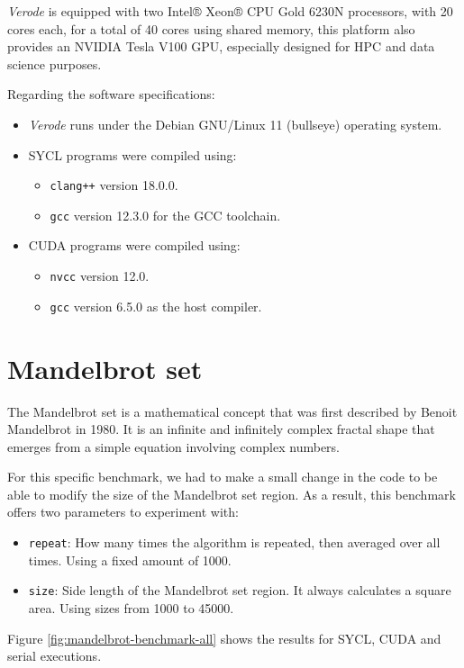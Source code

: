 \textit{Verode} is equipped with two Intel® Xeon® CPU Gold 6230N processors,  with 20 cores each, for a total of 40 cores using shared memory, this platform also provides an NVIDIA Tesla V100 GPU, especially designed for HPC and data science purposes.

Regarding the software specifications:
\begin{itemize}
    \item \textit{Verode} runs under the Debian GNU/Linux 11 (bullseye) operating system.
    \item SYCL programs were compiled using:
    \begin{itemize}
        \item \texttt{clang++} version 18.0.0.
        \item \texttt{gcc} version 12.3.0 for the GCC toolchain.
    \end{itemize}
    \item CUDA programs were compiled using:
        \begin{itemize}
            \item \texttt{nvcc} version 12.0.
            \item \texttt{gcc} version 6.5.0 as the host compiler.
        \end{itemize}
\end{itemize}

\section{Mandelbrot set}
The Mandelbrot set is a mathematical concept that was first described by Benoit Mandelbrot in 1980.
It is an infinite and infinitely complex fractal shape that emerges from a simple equation involving complex numbers.

For this specific benchmark, we had to make a small change in the code to be able to modify the size of the Mandelbrot set region.
As a result, this benchmark offers two parameters to experiment with:
\begin{itemize}
    \item \texttt{repeat}: How many times the algorithm is repeated, then averaged over all times. Using a fixed amount of 1000.
    \item \texttt{size}: Side length of the Mandelbrot set region. It always calculates a square area. Using sizes from 1000 to 45000.
\end{itemize}

Figure \ref{fig:mandelbrot-benchmark-all} shows the results for SYCL, CUDA and serial executions.

